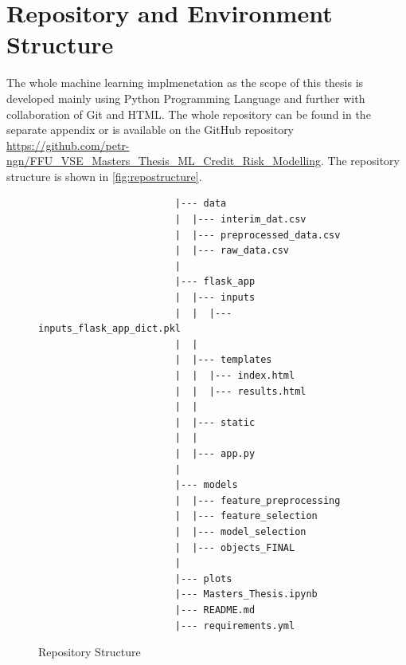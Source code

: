 \section{Repository and Environment Structure}
\label{sec:repo}
The whole machine learning implmenetation as the scope of this thesis is developed mainly using Python Programming Language and further with collaboration of Git and HTML.
The whole repository can be found in the separate appendix or is available on the GitHub repository \url{https://github.com/petr-ngn/FFU_VSE_Masters_Thesis_ML_Credit_Risk_Modelling}.
The repository structure is shown in \autoref{fig:repostructure}.
\begin{figure}[H]
\centering\caption{Repository Structure}
\label{fig:repostructure}

{\footnotesize
\begin{verbatim}
                        |--- data
                        |  |--- interim_dat.csv
                        |  |--- preprocessed_data.csv
                        |  |--- raw_data.csv
                        |
                        |--- flask_app
                        |  |--- inputs
                        |  |  |--- inputs_flask_app_dict.pkl
                        |  |
                        |  |--- templates
                        |  |  |--- index.html
                        |  |  |--- results.html
                        |  |
                        |  |--- static
                        |  |
                        |  |--- app.py
                        |
                        |--- models
                        |  |--- feature_preprocessing
                        |  |--- feature_selection
                        |  |--- model_selection
                        |  |--- objects_FINAL
                        |
                        |--- plots
                        |--- Masters_Thesis.ipynb
                        |--- README.md
                        |--- requirements.yml
\end{verbatim}
}
\vspace{0em}
\end{figure}


